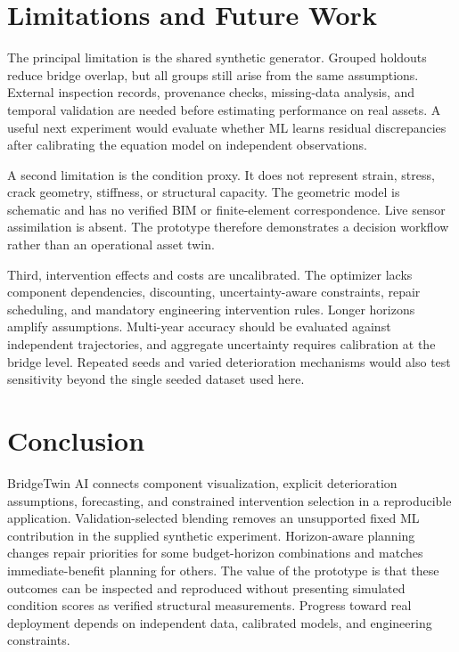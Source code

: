 \documentclass[conference]{IEEEtran}
\begin{document}
\section{Limitations and Future Work}
The principal limitation is the shared synthetic generator. Grouped holdouts reduce bridge overlap, but all groups still arise from the same assumptions. External inspection records, provenance checks, missing-data analysis, and temporal validation are needed before estimating performance on real assets. A useful next experiment would evaluate whether ML learns residual discrepancies after calibrating the equation model on independent observations.

A second limitation is the condition proxy. It does not represent strain, stress, crack geometry, stiffness, or structural capacity. The geometric model is schematic and has no verified BIM or finite-element correspondence. Live sensor assimilation is absent. The prototype therefore demonstrates a decision workflow rather than an operational asset twin.

Third, intervention effects and costs are uncalibrated. The optimizer lacks component dependencies, discounting, uncertainty-aware constraints, repair scheduling, and mandatory engineering intervention rules. Longer horizons amplify assumptions. Multi-year accuracy should be evaluated against independent trajectories, and aggregate uncertainty requires calibration at the bridge level. Repeated seeds and varied deterioration mechanisms would also test sensitivity beyond the single seeded dataset used here.

\section{Conclusion}
BridgeTwin AI connects component visualization, explicit deterioration assumptions, forecasting, and constrained intervention selection in a reproducible application. Validation-selected blending removes an unsupported fixed ML contribution in the supplied synthetic experiment. Horizon-aware planning changes repair priorities for some budget-horizon combinations and matches immediate-benefit planning for others. The value of the prototype is that these outcomes can be inspected and reproduced without presenting simulated condition scores as verified structural measurements. Progress toward real deployment depends on independent data, calibrated models, and engineering constraints.
\end{document}
